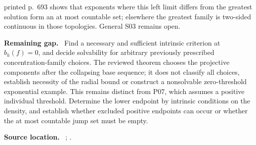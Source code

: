 \documentclass[11pt]{article}
\newcommand{\field}[1]{\par\medskip\noindent\textbf{#1.}\ }
\begin{document}
printed p.~693 shows that exponents where this left limit differs from the greatest solution form an at most countable set; elsewhere the greatest family is two-sided continuous in those topologies. General S03 remains open.
\field{Remaining gap} Find a necessary and sufficient intrinsic criterion at $b_h(f)=0$, and decide solvability for arbitrary previously prescribed concentration-family choices. The reviewed theorem chooses the projective components after the collapsing base sequence; it does not classify all choices, establish necessity of the radial bound or construct a nonsolvable zero-threshold exponential example. This remains distinct from P07, which assumes a positive individual threshold. Determine the lower endpoint by intrinsic conditions on the density, and establish whether excluded positive endpoints can occur or whether the at most countable jump set must be empty.
\field{Source location} ; .
\end{document}
